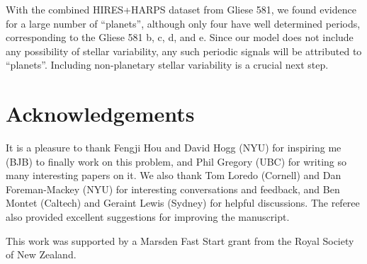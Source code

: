 \documentclass[useAMS,usenatbib]{mn2e}
\begin{document}
With the combined HIRES+HARPS dataset from Gliese 581, we found
evidence for a large number of ``planets'', although only four have well
determined periods, corresponding to the Gliese 581 b, c, d,
and e. Since our model does not include any possibility of stellar variability,
any such periodic signals will be attributed to ``planets''.
Including non-planetary stellar variability is a crucial next step.

\vspace{-0.5cm}
\section*{Acknowledgements}
It is a pleasure to thank Fengji Hou and David Hogg (NYU) for inspiring me (BJB) to
finally work on this problem, and Phil Gregory (UBC) for writing so many
interesting papers on it. We also thank Tom Loredo (Cornell) and Dan
Foreman-Mackey (NYU) for interesting conversations and feedback, and Ben
Montet (Caltech) and Geraint Lewis (Sydney) for helpful discussions.
The referee also provided excellent suggestions for improving the manuscript.

This work was supported by a Marsden Fast Start
grant from the Royal Society of
New Zealand.
\end{document}
